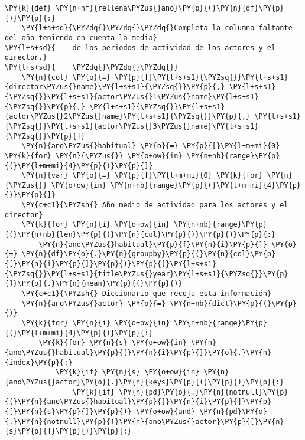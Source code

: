     \begin{tcolorbox}[breakable, size=fbox, boxrule=1pt, pad at break*=1mm,colback=cellbackground, colframe=cellborder]
\begin{Verbatim}[commandchars=\\\{\}]
\PY{k}{def} \PY{n+nf}{rellena\PYZus{}ano}\PY{p}{(}\PY{n}{df}\PY{p}{)}\PY{p}{:}
    \PY{l+s+sd}{\PYZdq{}\PYZdq{}\PYZdq{}Completa la columna faltante del año teniendo en cuenta la media}
\PY{l+s+sd}{    de los periodos de actividad de los actores y el director.}
\PY{l+s+sd}{    \PYZdq{}\PYZdq{}\PYZdq{}}
    \PY{n}{col} \PY{o}{=} \PY{p}{[}\PY{l+s+s1}{\PYZsq{}}\PY{l+s+s1}{director\PYZus{}name}\PY{l+s+s1}{\PYZsq{}}\PY{p}{,} \PY{l+s+s1}{\PYZsq{}}\PY{l+s+s1}{actor\PYZus{}1\PYZus{}name}\PY{l+s+s1}{\PYZsq{}}\PY{p}{,} \PY{l+s+s1}{\PYZsq{}}\PY{l+s+s1}{actor\PYZus{}2\PYZus{}name}\PY{l+s+s1}{\PYZsq{}}\PY{p}{,} \PY{l+s+s1}{\PYZsq{}}\PY{l+s+s1}{actor\PYZus{}3\PYZus{}name}\PY{l+s+s1}{\PYZsq{}}\PY{p}{]}
    \PY{n}{ano\PYZus{}habitual} \PY{o}{=} \PY{p}{[}\PY{l+m+mi}{0} \PY{k}{for} \PY{n}{\PYZus{}} \PY{o+ow}{in} \PY{n+nb}{range}\PY{p}{(}\PY{l+m+mi}{4}\PY{p}{)}\PY{p}{]}
    \PY{n}{var} \PY{o}{=} \PY{p}{[}\PY{l+m+mi}{0} \PY{k}{for} \PY{n}{\PYZus{}} \PY{o+ow}{in} \PY{n+nb}{range}\PY{p}{(}\PY{l+m+mi}{4}\PY{p}{)}\PY{p}{]}
    \PY{c+c1}{\PYZsh{} Año medio de actividad para los actores y el director}
    \PY{k}{for} \PY{n}{i} \PY{o+ow}{in} \PY{n+nb}{range}\PY{p}{(}\PY{n+nb}{len}\PY{p}{(}\PY{n}{col}\PY{p}{)}\PY{p}{)}\PY{p}{:}
        \PY{n}{ano\PYZus{}habitual}\PY{p}{[}\PY{n}{i}\PY{p}{]} \PY{o}{=} \PY{n}{df}\PY{o}{.}\PY{n}{groupby}\PY{p}{(}\PY{n}{col}\PY{p}{[}\PY{n}{i}\PY{p}{]}\PY{p}{)}\PY{p}{[}\PY{l+s+s1}{\PYZsq{}}\PY{l+s+s1}{title\PYZus{}year}\PY{l+s+s1}{\PYZsq{}}\PY{p}{]}\PY{o}{.}\PY{n}{mean}\PY{p}{(}\PY{p}{)}
    \PY{c+c1}{\PYZsh{} Diccionario que recoja esta información}
    \PY{n}{ano\PYZus{}actor} \PY{o}{=} \PY{n+nb}{dict}\PY{p}{(}\PY{p}{)}
    \PY{k}{for} \PY{n}{i} \PY{o+ow}{in} \PY{n+nb}{range}\PY{p}{(}\PY{l+m+mi}{4}\PY{p}{)}\PY{p}{:}
        \PY{k}{for} \PY{n}{s} \PY{o+ow}{in} \PY{n}{ano\PYZus{}habitual}\PY{p}{[}\PY{n}{i}\PY{p}{]}\PY{o}{.}\PY{n}{index}\PY{p}{:}
            \PY{k}{if} \PY{n}{s} \PY{o+ow}{in} \PY{n}{ano\PYZus{}actor}\PY{o}{.}\PY{n}{keys}\PY{p}{(}\PY{p}{)}\PY{p}{:}
                \PY{k}{if} \PY{n}{pd}\PY{o}{.}\PY{n}{notnull}\PY{p}{(}\PY{n}{ano\PYZus{}habitual}\PY{p}{[}\PY{n}{i}\PY{p}{]}\PY{p}{[}\PY{n}{s}\PY{p}{]}\PY{p}{)} \PY{o+ow}{and} \PY{n}{pd}\PY{o}{.}\PY{n}{notnull}\PY{p}{(}\PY{n}{ano\PYZus{}actor}\PY{p}{[}\PY{n}{s}\PY{p}{]}\PY{p}{)}\PY{p}{:}

\end{Verbatim}
\end{tcolorbox}

